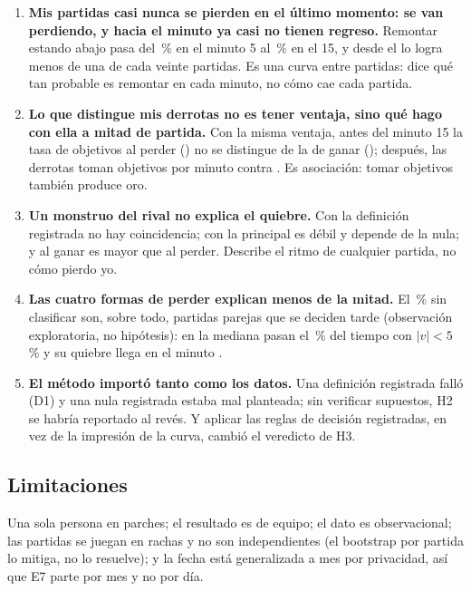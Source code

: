 \documentclass[11pt,letterpaper]{article}
\begin{document}
\begin{enumerate}[leftmargin=1.6em,itemsep=.45em]
  \item \textbf{Mis partidas casi nunca se pierden en el último momento: se van
        perdiendo, y hacia el minuto \hTresPunto{} ya casi no tienen regreso.} Remontar
        estando abajo pasa del \hTresCinco\,\% en el minuto 5 al \hTresQuince\,\% en el
        15, y desde el \hTresPunto{} lo logra menos de una de cada veinte partidas. Es
        una curva entre partidas: dice qué tan probable es remontar en cada minuto, no
        cómo cae cada partida.
  \item \textbf{Lo que distingue mis derrotas no es tener ventaja, sino qué hago con
        ella a mitad de partida.} Con la misma ventaja, antes del minuto 15 la tasa de
        objetivos al perder (\hUnoDerA) no se distingue de la de ganar (\hUnoVicA);
        después, las derrotas toman \hUnoDerB{} objetivos por minuto contra \hUnoVicB. Es asociación: tomar
        objetivos también produce oro.
  \item \textbf{Un monstruo del rival no explica el quiebre.} Con la definición
        registrada no hay coincidencia; con la principal es débil y depende de la nula; y
        al ganar es mayor que al perder. Describe el ritmo de cualquier partida, no cómo
        pierdo yo.
  \item \textbf{Las cuatro formas de perder explican menos de la mitad.} El
        \pctSinClas\,\% sin clasificar son, sobre todo, partidas parejas que se deciden
        tarde (observación exploratoria, no hipótesis): en la mediana pasan el
        \exTranquilo\,\% del tiempo con \(|v| < 5\)\,\% y su quiebre llega en el minuto
        \exDdos.
  \item \textbf{El método importó tanto como los datos.} Una definición registrada
        falló (D1) y una nula registrada estaba mal planteada; sin verificar supuestos,
        H2 se habría reportado al revés. Y aplicar las reglas de decisión registradas,
        en vez de la impresión de la curva, cambió el veredicto de H3.
\end{enumerate}

\subsection*{Limitaciones}
Una sola persona en \nParches{} parches; el resultado es de equipo; el dato es
observacional; las partidas se juegan en rachas y no son independientes (el bootstrap
por partida lo mitiga, no lo resuelve); y la fecha está generalizada a mes por
privacidad, así que E7 parte por mes y no por día.
\end{document}
